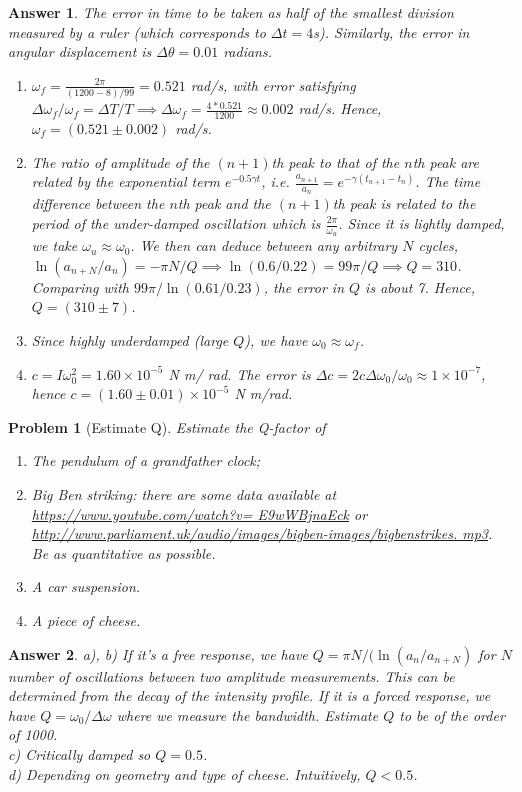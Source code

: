 \documentclass[a4paper]{article}
\newtheorem{ans}{Answer}[section]
\theoremstyle{new}
\newtheorem{qns}{Problem}[section]
\begin{document}
\begin{ans}
The error in time to be taken as half of the smallest division measured by a ruler (which corresponds to $\Delta t=4$s). Similarly, the error in angular displacement is $\Delta\theta=0.01$ radians.
\begin{enumerate}[label=(\alph*)]
\item $\omega_f=\frac{2\pi}{(1200-8)/99}=0.521$ rad/s, with error satisfying $\Delta\omega_f/\omega_f=\Delta T/T\implies\Delta\omega_f=\frac{4*0.521}{1200}\approx0.002$ rad/s. Hence, $\omega_f=(0.521\pm0.002)$ rad/s.
\item The ratio of amplitude of the $(n+1)$th peak to that of the $n$th peak are related by the exponential term $e^{-0.5\gamma t}$, i.e. $\frac{a_{n+1}}{a_n}=e^{-\gamma(t_{n+1}-t_n)}$. The time difference between the $n$th peak and the $(n+1)$th peak is related to the period of the under-damped oscillation which is $\frac{2\pi}{\omega_u}$. Since it is lightly damped, we take $\omega_u\approx\omega_0$. We then can deduce between any arbitrary $N$ cycles, $\ln(a_{n+N}/a_n)=-\pi N/Q\implies\ln(0.6/0.22)=99\pi/Q\implies Q=310$. Comparing with $99\pi/\ln(0.61/0.23)$, the error in $Q$ is about 7. Hence, $Q=(310\pm 7)$.
\item Since highly underdamped (large $Q$), we have $\omega_0\approx\omega_f$.
\item $c=I\omega_0^2=1.60\times10^{-5}$ N m/ rad. The error is $\Delta c=2c\Delta\omega_0/\omega_0\approx1\times10^{-7}$, hence $c=(1.60\pm0.01)\times10^{-5}$ N m/rad.
\end{enumerate}
\end{ans}
\begin{qns}[Estimate Q]
Estimate the Q-factor of
\begin{enumerate}[label=(\alph*)]
    \item The pendulum of a grandfather clock;
    \item Big Ben striking: there are some data available at \url{https://www.youtube.com/watch?v=
E9wWBjnaEck} or \url{http://www.parliament.uk/audio/images/bigben-images/bigbenstrikes.
mp3}. Be as quantitative as possible.
\item A car suspension.
\item A piece of cheese.
\end{enumerate}
\end{qns}
\begin{ans}
a), b) If it's a free response, we have $Q=\pi N/(\ln(a_n/a_{n+N})$ for $N$ number of oscillations between two amplitude measurements. This can be determined from the decay of the intensity profile. If it is a forced response, we have $Q=\omega_0/\Delta\omega$ where we measure the bandwidth. Estimate $Q$ to be of the order of 1000.\\[5pt]
c) Critically damped so $Q=0.5$.\\[5pt]
d) Depending on geometry and type of cheese. Intuitively, $Q<0.5$.
\end{ans}
\end{document}
